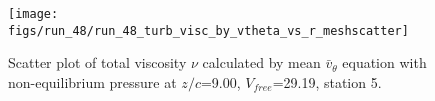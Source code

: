 \begin{figure}[H]
\centering
\texttt{[image: figs/run\_48/run\_48\_turb\_visc\_by\_vtheta\_vs\_r\_meshscatter]}
\caption{Scatter plot of total viscosity $\nu$ calculated by mean $\bar{v}_{\theta}$ equation with non-equilibrium pressure at $z/c$=9.00, $V_{free}$=29.19, station 5.}
\label{fig:run_48_turb_visc_by_vtheta_vs_r_meshscatter}
\end{figure}


